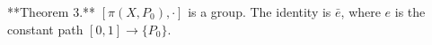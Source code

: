 **Theorem 3.** $[\pi(X, P_0), \cdot]$ is a group. The identity is $\bar{e}$, where $e$ is the constant path $[0, 1] \to \{P_0\}$.
